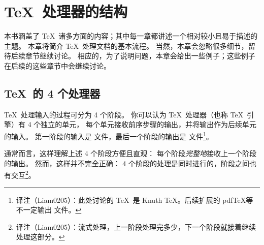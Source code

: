 \documentclass{book}
\begin{document}
\chapter{\TeX\ 处理器的结构}

本书涵盖了 \TeX\ 诸多方面的内容；其中每一章都讲述一个相对较小且易于描述的主题。
本章将简介 \TeX\ 处理文档的基本流程。
当然，本章会忽略很多细节，留待后续章节继续讨论。
相应的，为了说明问题，本章会给出一些例子；这些例子在后续的这些章节中会继续讨论。

\section{\TeX\ 的 4 个处理器}

\TeX\ 处理输入的过程可分为 4 个阶段。
你可以认为 \TeX\ 处理器（也称 \TeX\ 引擎）有 4 个独立的单元，
每个单元接收前序步骤的输出，并将输出作为后续单元的输入。
第一阶段的输入是  文件，最后一个阶段的输出是  文件\footnote{译注（Liam0205）：此处讨论的 \TeX\ 是 Knuth \TeX。后续扩展的 pdf\TeX 等不一定输出  文件。}。%

通常而言，这样理解上述 4 个阶段方便且直观：
每个阶段\emph{完整地}接收上一个阶段的输出。
然而，这样并不完全正确：
4 个阶段的处理是同时进行的，阶段之间也有交互\footnote{译注（Liam0205）：流式处理，上一阶段处理完多少，下一个阶段就接着继续处理这部分。}。
\end{document}
